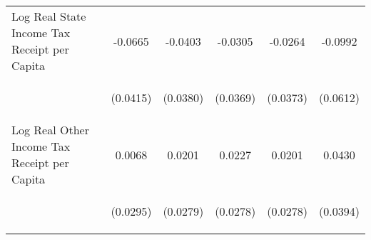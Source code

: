 \begin{center}
\begin{tabular}{lccccc}
\noalign{\smallskip}Log Real State Income Tax Receipt per Capita & \begin{scriptsize}-0.0665\end{scriptsize} & \begin{scriptsize}-0.0403\end{scriptsize} & \begin{scriptsize}-0.0305\end{scriptsize} & \begin{scriptsize}-0.0264\end{scriptsize} & \begin{scriptsize}-0.0992\end{scriptsize}\\
 & \begin{scriptsize}(0.0415)\end{scriptsize} & \begin{scriptsize}(0.0380)\end{scriptsize} & \begin{scriptsize}(0.0369)\end{scriptsize} & \begin{scriptsize}(0.0373)\end{scriptsize} & \begin{scriptsize}(0.0612)\end{scriptsize}\\
\noalign{\smallskip}Log Real Other Income Tax Receipt per Capita & \begin{scriptsize}0.0068\end{scriptsize} & \begin{scriptsize}0.0201\end{scriptsize} & \begin{scriptsize}0.0227\end{scriptsize} & \begin{scriptsize}0.0201\end{scriptsize} & \begin{scriptsize}0.0430\end{scriptsize}\\
 & \begin{scriptsize}(0.0295)\end{scriptsize} & \begin{scriptsize}(0.0279)\end{scriptsize} & \begin{scriptsize}(0.0278)\end{scriptsize} & \begin{scriptsize}(0.0278)\end{scriptsize} & \begin{scriptsize}(0.0394)\end{scriptsize}\\

\end{tabular}
\end{center}

